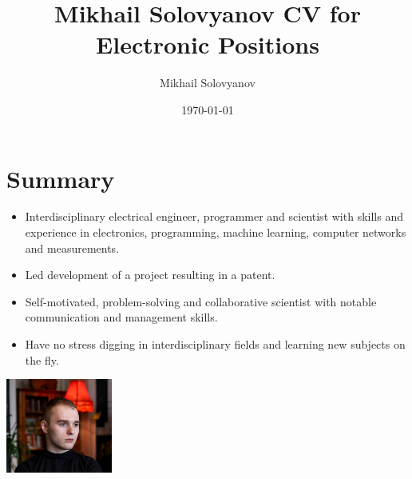 \documentclass{article}
\title{ Mikhail Solovyanov CV for Electronic Positions}
\author{Mikhail Solovyanov}
\date{\today}
\begin{document}
 
\makecvtitle %

\section{Summary}
\begin{minipage}{0.7\textwidth}
   \begin{itemize}
      \item Interdisciplinary electrical engineer, programmer and scientist with skills and experience in electronics, programming, machine learning, computer networks and measurements.
      \item Led development of a  project resulting in a patent.
      \item Self-motivated, problem-solving and collaborative scientist with notable communication and management skills.
      \item Have no stress digging in interdisciplinary fields and learning new subjects on the fly.
      \end{itemize}
   \end{minipage}%
   \hfill
   \begin{minipage}{0.3\textwidth}
      \includegraphics[width=3.5cm,right]{picture.jpg}
\end{minipage}%
\end{document}
